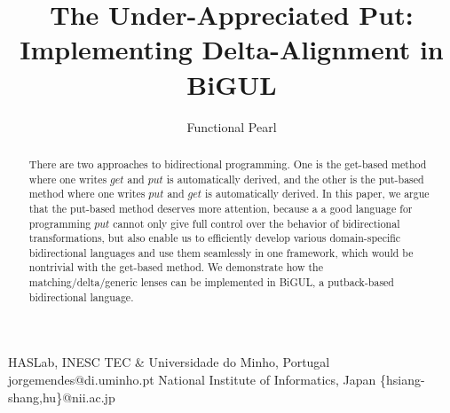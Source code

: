 \documentclass[preprint,numbers]{sigplanconf}
\newif\ifanonymous
\newcommand{\Varid}[1]{\mathit{#1}}
\begin{document}
\GRACETRmakecover


\setlength{\pdfpageheight}{\paperheight}
\setlength{\pdfpagewidth}{\paperwidth}




\title{The Under-Appreciated Put: Implementing Delta-Alignment in BiGUL}
\subtitle{Functional Pearl}

\ifanonymous
\authorinfo{}{}{}
\else
{}
           {\hspace{-.5cm}HASLab, INESC TEC \& Universidade do Minho, Portugal\hspace{-.5cm}}
           {jorgemendes@di.uminho.pt}
           {National Institute of Informatics, Japan}
           {\{hsiang-shang,hu\}@nii.ac.jp}
\fi

\maketitle

\begin{abstract}
There are two approaches to bidirectional programming.
One is the get-based method where one writes \ensuremath{\Varid{get}} and
\ensuremath{\Varid{put}} is automatically derived, and the other is
the put-based method where one writes \ensuremath{\Varid{put}} and
\ensuremath{\Varid{get}} is automatically derived.
In this paper, we argue that the put-based method
deserves more attention, because a
a good language for programming \ensuremath{\Varid{put}} cannot only
give full control over the behavior of bidirectional transformations,
but also enable us to efficiently
develop various domain-specific bidirectional languages and use
them seamlessly in one framework, which
would be nontrivial with the get-based method.
We demonstrate how the matching/delta/generic lenses can be
implemented in BiGUL, a putback-based
bidirectional language.
\end{abstract}
\end{document}
